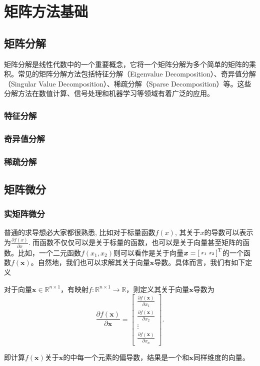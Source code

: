 \chapter{矩阵方法基础}

\section{矩阵分解}
矩阵分解是线性代数中的一个重要概念，它将一个矩阵分解为多个简单的矩阵的乘积。常见的矩阵分解方法包括特征分解（Eigenvalue Decomposition）、奇异值分解（Singular Value Decomposition）、稀疏分解（Sparse Decomposition）等。这些分解方法在数值计算、信号处理和机器学习等领域有着广泛的应用。

\subsection{特征分解}

\subsection{奇异值分解}

\subsection{稀疏分解}


\section{矩阵微分}

\subsection{实矩阵微分}
普通的求导想必大家都很熟悉, 比如对于标量函数$f(x)$, 其关于$x$的导数可以表示为\( \frac{\partial f(x)}{\partial x} \). 而函数不仅仅可以是关于标量的函数，也可以是关于向量甚至矩阵的函数。比如，一个二元函数\( f(x_1, x_2) \)则可以看作是关于向量\( \boldsymbol{x} = \begin{bsmallmatrix} x_1 & x_2 \end{bsmallmatrix}^{\mathrm{T}} \)的一个函数\( f(\bm{x}) \)。自然地，我们也可以求解其关于向量\( \bm{x} \)导数。具体而言，我们有如下定义

\begin{definition}[标量关于向量求导]
    对于向量$\bm{x} \in \mathbb{R}^{n \times 1}$，有映射\( f: \mathbb{R}^{n \times 1} \rightarrow \mathbb{R} \)，则定义其关于向量\( \bm{x} \)导数为
    \[
        \frac{\partial f(\bm{x})}{\partial \bm{x}}  = \begin{bmatrix}
            \frac{\partial f(\bm{x})}{\partial x_1} \\
            \frac{\partial f(\bm{x})}{\partial x_2} \\
            \vdots                                  \\
            \frac{\partial f(\bm{x})}{\partial x_n}
        \end{bmatrix}.
    \]
\end{definition}
即计算\( f(\bm{x}) \)关于\( \bm{x} \)的中每一个元素的偏导数，结果是一个和\( \bm{x} \)同样维度的向量。

